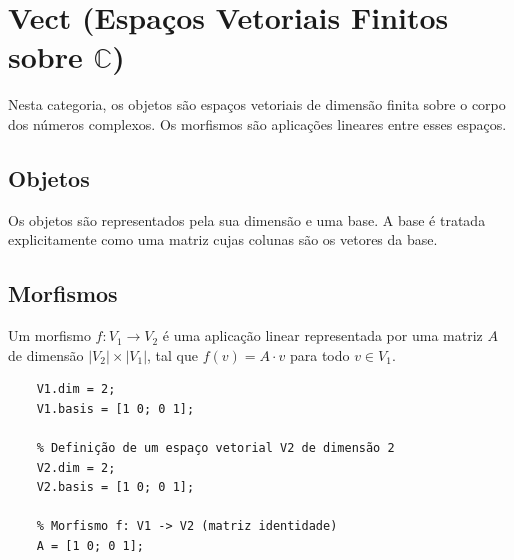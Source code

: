 \section{Vect (Espaços Vetoriais Finitos sobre $\mathbb{C}$)}
\label{sec:vect}

Nesta categoria, os objetos são espaços vetoriais de dimensão finita sobre o corpo dos números complexos. Os morfismos são aplicações lineares entre esses espaços.

\subsection{Objetos}
Os objetos são representados pela sua dimensão e uma base. A base é tratada explicitamente como uma matriz cujas colunas são os vetores da base.

\subsection{Morfismos}
Um morfismo $f: V_1 \to V_2$ é uma aplicação linear representada por uma matriz $A$ de dimensão $|V_2| \times |V_1|$, tal que $f(v) = A \cdot v$ para todo $v \in V_1$.

\begin{lstlisting}[style=matlab, caption={Exemplo de Espaço Vetorial e Morfismo}]
	% Definição de um espaço vetorial V1 de dimensão 2
	V1.dim = 2;
	V1.basis = [1 0; 0 1];
	
	% Definição de um espaço vetorial V2 de dimensão 2
	V2.dim = 2;
	V2.basis = [1 0; 0 1];
	
	% Morfismo f: V1 -> V2 (matriz identidade)
	A = [1 0; 0 1];
\end{lstlisting}